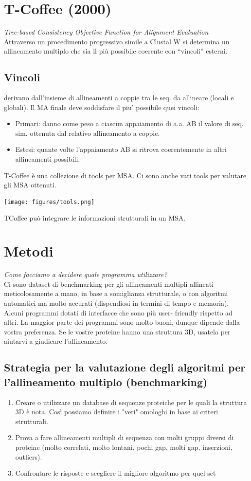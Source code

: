 \documentclass{article}
\begin{document}
\section{T-Coffee (2000)}
\textit{Tree-based Consistency Objective Function for Alignment Evaluation}\\
Attraverso un procedimento progressivo simile a Clustal W si determina
un allineamento multiplo che sia il più possibile coerente con
“vincoli” esterni.
\subsection{Vincoli}
derivano dall'insieme di allineamenti a coppie tra le seq. da allineare (locali e
globali). Il MA finale deve soddisfare il piu' possibile quei vincoli:
\begin{itemize}
    \item Primari: danno come peso a ciascun appaiamento di a.a. AB il valore di seq. sim.
    ottenuta dal relativo allineamento a coppie.
    \item Estesi: quante volte l'appaiamento AB si ritrova coerentemente in altri allineamenti
    possibili.
\end{itemize}
T-Coffee è una collezione di tools per MSA. Ci sono anche vari tools per
valutare gli MSA ottenuti.
\begin{center}
    \texttt{[image: figures/tools.png]}
\end{center}
TCoffee può integrare le informazioni strutturali in un MSA.
\section{Metodi}
\textit{Come facciamo a decidere quale programma utilizzare?}\\
Ci sono dataset di benchmarking per gli allineamenti multipli
allineati meticolosamente a mano, in base a somiglianza
strutturale, o con algoritmi automatici ma molto accurati
(dispendiosi in termini di tempo e memoria). Alcuni programmi dotati di interfacce che sono più user-
friendly rispetto ad altri. La maggior parte dei programmi sono
molto buoni, dunque dipende dalla vostra preferenza. Se le vostre proteine hanno una struttura 3D, usatela per
aiutarvi a giudicare l'allineamento.
\subsection{Strategia per la valutazione degli algoritmi per l'allineamento multiplo (benchmarking)}
\begin{enumerate}
    \item Creare o utilizzare un database di sequenze proteiche per le
    quali la struttura 3D è nota. Così possiamo definire i "veri"
    omologhi in base ai criteri strutturali.
    \item Prova a fare allineamenti multipli di sequenza
    con molti gruppi diversi di proteine (molto correlati,
    molto lontani, pochi gap, molti gap, inserzioni, outliers).
    \item Confrontare le risposte e scegliere il migliore algoritmo per
    quel set
\end{enumerate}
\end{document}
